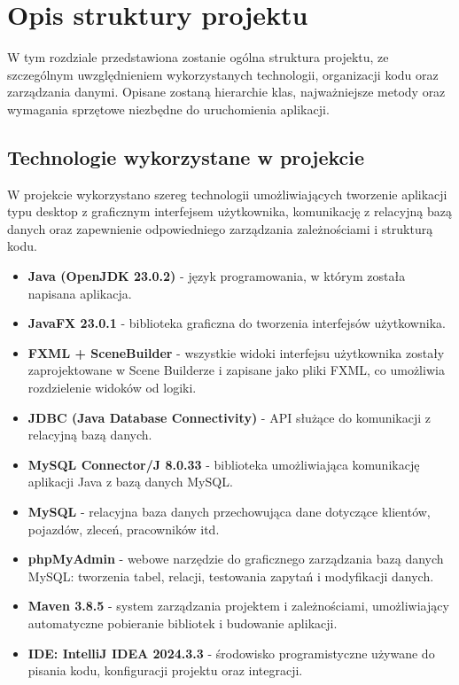 \chapter{Opis struktury projektu}
\label{cha:opisStruktury}

W tym rozdziale przedstawiona zostanie ogólna struktura projektu, ze szczególnym uwzględnieniem wykorzystanych technologii, organizacji kodu oraz zarządzania danymi. Opisane zostaną hierarchie klas, najważniejsze metody oraz wymagania sprzętowe niezbędne do uruchomienia aplikacji.

\section{Technologie wykorzystane w projekcie}
\label{sec:technologieWykorzystane}
W projekcie wykorzystano szereg technologii umożliwiających tworzenie aplikacji typu desktop z graficznym interfejsem użytkownika, komunikację z relacyjną bazą danych oraz zapewnienie odpowiedniego zarządzania zależnościami i strukturą kodu.

\begin{itemize}
    \item \textbf{Java (OpenJDK 23.0.2)} - język programowania, w którym została napisana aplikacja.
    \item \textbf{JavaFX 23.0.1} - biblioteka graficzna do tworzenia interfejsów użytkownika.
    \item \textbf{FXML + SceneBuilder} - wszystkie widoki interfejsu użytkownika zostały zaprojektowane w Scene Builderze i zapisane jako pliki FXML, co umożliwia rozdzielenie widoków od logiki.
    \item \textbf{JDBC (Java Database Connectivity)} - API służące do komunikacji z relacyjną bazą danych.
    \item \textbf{MySQL Connector/J 8.0.33} - biblioteka umożliwiająca komunikację aplikacji Java z bazą danych MySQL.
    \item \textbf{MySQL} - relacyjna baza danych przechowująca dane dotyczące klientów, pojazdów, zleceń, pracowników itd.
    \item \textbf{phpMyAdmin} - webowe narzędzie do graficznego zarządzania bazą danych MySQL: tworzenia tabel, relacji, testowania zapytań i modyfikacji danych.
    \item \textbf{Maven 3.8.5} - system zarządzania projektem i zależnościami, umożliwiający automatyczne pobieranie bibliotek i budowanie aplikacji.
    \item \textbf{IDE: IntelliJ IDEA 2024.3.3} - środowisko programistyczne używane do pisania kodu, konfiguracji projektu oraz integracji.
\end{itemize}

